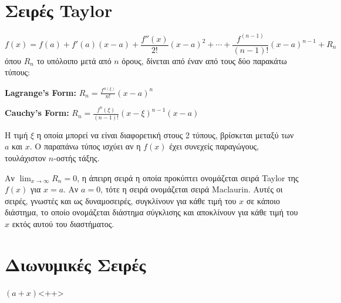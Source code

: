 

\section{Σειρές \textlatin{Taylor}}

\[
    f(x) = f(a) + f'(a)(x-a) + \frac{f''(x)}{2!} (x-a)^{2} + \cdots +
    \frac{f^{(n-1)}}{(n-1)!} (x-a)^{n-1} + R_{n}
\] 
όπου $ R_{n} $ το υπόλοιπο μετά από $n $ όρους, δίνεται από έναν από τους δύο
παρακάτω τύπους:

\textbf{\textlatin{Lagrange's Form:}} $ R_{n} = \frac{f^{n(\xi)}}{n!} (x-a)^{n} $

\textbf{\textlatin{Cauchy's Form:}} $ R_{n} = \frac{f^{n}(\xi)}{(n-1)!}
(x-\xi)^{n-1}(x-a) $

Η τιμή $\xi$ η οποία μπορεί να είναι διαφορετική στους 2 τύπους, βρίσκεται
μεταξύ των $ a $ και $ x$. Ο παραπάνω τύπος ισχύει αν η $ f(x) $ έχει συνεχείς
παραγώγους, τουλάχιστον $ n $-οστής τάξης. 

Αν $ \lim_{x\to \infty} R_{n} = 0 $, η άπειρη σειρά η οποία προκύπτει ονομάζεται
σειρά \textlatin{Taylor} της $ f(x) $ για $ x=a $. Αν $ a = 0 $, τότε η σειρά
ονομάζεται σειρά \textlatin{Maclaurin}. Αυτές οι σειρές, γνωστές και ως
δυναμοσειρές, συγκλίνουν για κάθε τιμή του $x$ σε κάποιο διάστημα, το οποίο
ονομάζεται διάστημα σύγκλισης και αποκλίνουν για κάθε τιμή του $x$ εκτός αυτού
του διαστήματος.

\section{Διωνυμικές Σειρές}

$ (a+x) $<++>








































